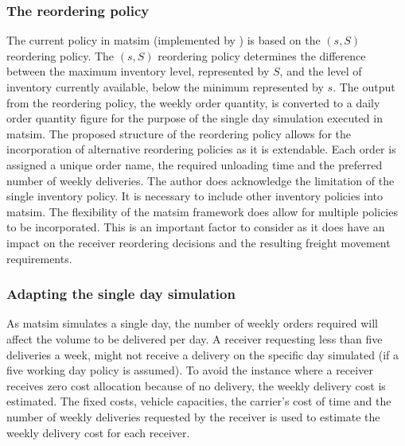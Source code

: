 \subsubsection{The reordering policy} 
The current policy in \acrshort{matsim} (implemented by \citet{bean2020behavioural}) is based on the \((s,S)\) reordering policy. The \((s,S)\) reordering policy determines the difference between the maximum inventory level, represented by \(S\), and the level of inventory currently available, below the minimum represented by \(s\). The output from the reordering policy, the weekly order quantity, is converted to a daily order quantity figure for the purpose of the single day simulation executed in \acrshort{matsim}. The proposed structure of the reordering policy allows for the incorporation of alternative reordering policies as it is extendable. Each order is assigned a unique order name, the required unloading time and the preferred number of weekly deliveries. The author does acknowledge the limitation of the single inventory policy. It is necessary to include other inventory policies into \acrshort{matsim}. The flexibility of the \acrshort{matsim} framework does allow for multiple policies to be incorporated. This is an important factor to consider as it does have an impact on the receiver reordering decisions and the resulting freight movement requirements. \par


\subsubsection{Adapting the single day simulation}
As \acrshort{matsim} simulates a single day, the number of weekly orders required will affect the volume to be delivered per day. A receiver requesting less than five deliveries a week, might not receive a delivery on the specific day simulated (if a five working day policy is assumed). To avoid the instance where a receiver receives zero cost allocation because of no delivery, the weekly delivery cost is estimated. The fixed costs, vehicle capacities, the carrier's cost of time and the number of weekly deliveries requested by the receiver is used to estimate the weekly delivery cost for each receiver.\par

